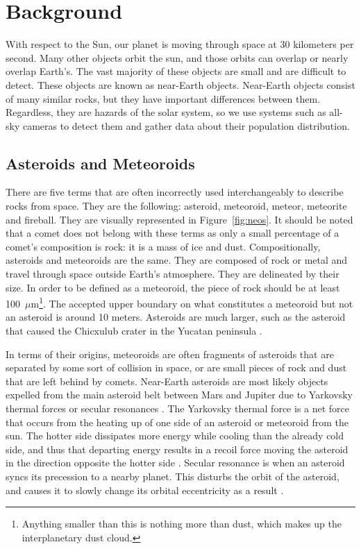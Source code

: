 \chapter{Background}
With respect to the Sun, our planet is moving through space at 30 kilometers per second. Many other objects orbit the sun, and those orbits can overlap or nearly overlap Earth's. The vast majority of these objects are small and are difficult to detect. These objects are known as near-Earth objects. Near-Earth objects consist of many similar rocks, but they have important differences between them. Regardless, they are hazards of the solar system, so we use systems such as all-sky cameras to detect them and gather data about their population distribution.

\section{Asteroids and Meteoroids}
There are five terms that are often incorrectly used interchangeably to describe rocks from space. They are the following: asteroid, meteoroid, meteor, meteorite and fireball. They are visually represented in Figure~\ref{fig:neos}. It should be noted that a comet does not belong with these terms as only a small percentage of a comet's composition is rock: it is a mass of ice and dust. Compositionally, asteroids and meteoroids are the same. They are composed of rock or metal and travel through space outside Earth's atmosphere. They are delineated by their size.  In order to be defined as a meteoroid, the piece of rock should be at least \mbox{100 $\mu$m}\footnote{Anything smaller than this is nothing more than dust, which makes up the interplanetary dust cloud.}\cite{Steel1996}. The accepted upper boundary on what constitutes a meteoroid but not an asteroid is around 10 meters. 
Asteroids are much larger, such as the asteroid that caused the Chicxulub crater in the Yucatan peninsula \cite{Bottke2007}.

In terms of their origins, meteoroids are often fragments of asteroids that are separated by some sort of collision in space, or are small pieces of rock and dust that are left behind by comets. Near-Earth asteroids are most likely objects expelled from the main asteroid belt between Mars and Jupiter due to Yarkovsky thermal forces or secular resonances \cite{Bottke2007}. The Yarkovsky thermal force is a net force that occurs from the heating up of one side of an asteroid or meteoroid from the sun. The hotter side dissipates more energy while cooling than the already cold side, and thus that departing energy results in a recoil force moving the asteroid in the direction opposite the hotter side \cite{Bottke2006}. Secular resonance is when an asteroid syncs its precession to a nearby planet. This disturbs the orbit of the asteroid, and causes it to slowly change its orbital eccentricity as a result \cite{Moons1995}.

